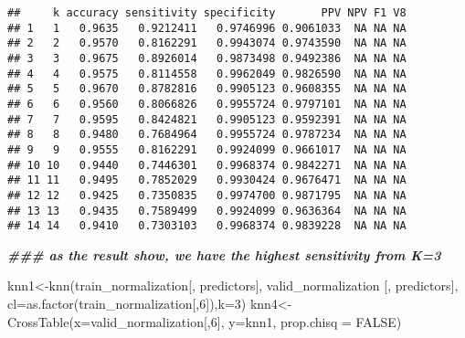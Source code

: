 \documentclass[
]{article}
\newenvironment{Shaded}{\begin{snugshade}}{\end{snugshade}}
\newcommand{\AttributeTok}[1]{\textcolor[rgb]{0.77,0.63,0.00}{#1}}
\newcommand{\ConstantTok}[1]{\textcolor[rgb]{0.00,0.00,0.00}{#1}}
\newcommand{\DecValTok}[1]{\textcolor[rgb]{0.00,0.00,0.81}{#1}}
\newcommand{\DocumentationTok}[1]{\textcolor[rgb]{0.56,0.35,0.01}{\textbf{\textit{#1}}}}
\newcommand{\FunctionTok}[1]{\textcolor[rgb]{0.00,0.00,0.00}{#1}}
\newcommand{\NormalTok}[1]{#1}
\newcommand{\OtherTok}[1]{\textcolor[rgb]{0.56,0.35,0.01}{#1}}
\newcommand{\SpecialCharTok}[1]{\textcolor[rgb]{0.00,0.00,0.00}{#1}}
\newcommand{\StringTok}[1]{\textcolor[rgb]{0.31,0.60,0.02}{#1}}
\begin{document}
\begin{Shaded}
\end{Shaded}

\begin{verbatim}
##     k accuracy sensitivity specificity       PPV NPV F1 V8
## 1   1   0.9635   0.9212411   0.9746996 0.9061033  NA NA NA
## 2   2   0.9570   0.8162291   0.9943074 0.9743590  NA NA NA
## 3   3   0.9675   0.8926014   0.9873498 0.9492386  NA NA NA
## 4   4   0.9575   0.8114558   0.9962049 0.9826590  NA NA NA
## 5   5   0.9670   0.8782816   0.9905123 0.9608355  NA NA NA
## 6   6   0.9560   0.8066826   0.9955724 0.9797101  NA NA NA
## 7   7   0.9595   0.8424821   0.9905123 0.9592391  NA NA NA
## 8   8   0.9480   0.7684964   0.9955724 0.9787234  NA NA NA
## 9   9   0.9555   0.8162291   0.9924099 0.9661017  NA NA NA
## 10 10   0.9440   0.7446301   0.9968374 0.9842271  NA NA NA
## 11 11   0.9495   0.7852029   0.9930424 0.9676471  NA NA NA
## 12 12   0.9425   0.7350835   0.9974700 0.9871795  NA NA NA
## 13 13   0.9435   0.7589499   0.9924099 0.9636364  NA NA NA
## 14 14   0.9410   0.7303103   0.9968374 0.9839228  NA NA NA
\end{verbatim}

\begin{Shaded}
\begin{Highlighting}[]
\DocumentationTok{\#\#\# as the result show, we have the highest sensitivity from K=3}

\NormalTok{knn1}\OtherTok{\textless{}{-}}\FunctionTok{knn}\NormalTok{(train\_normalization[, predictors], valid\_normalization [, predictors], }\AttributeTok{cl=}\FunctionTok{as.factor}\NormalTok{(train\_normalization[,}\DecValTok{6}\NormalTok{]),}\AttributeTok{k=}\DecValTok{3}\NormalTok{)}
\NormalTok{knn4}\OtherTok{\textless{}{-}} \FunctionTok{CrossTable}\NormalTok{(}\AttributeTok{x=}\NormalTok{valid\_normalization[,}\DecValTok{6}\NormalTok{], }\AttributeTok{y=}\NormalTok{knn1, }\AttributeTok{prop.chisq =} \ConstantTok{FALSE}\NormalTok{)}
\end{Highlighting}
\end{Shaded}
\end{document}
